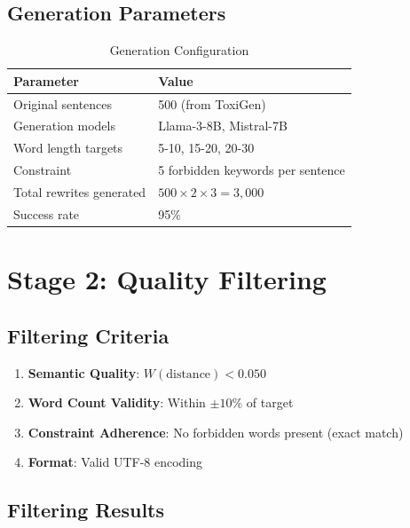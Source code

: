 \documentclass[12pt,a4paper]{report}
\begin{document}
\subsection{Generation Parameters}

\begin{table}[H]
\centering
\begin{tabular}{ll}
\toprule
\textbf{Parameter} & \textbf{Value} \\
\midrule
Original sentences & 500 (from ToxiGen) \\
Generation models & Llama-3-8B, Mistral-7B \\
Word length targets & 5-10, 15-20, 20-30 \\
Constraint & 5 forbidden keywords per sentence \\
Total rewrites generated & $500 \times 2 \times 3 = 3,000$ \\
Success rate & 95\% \\
\bottomrule
\end{tabular}
\caption{Generation Configuration}
\end{table}

\section{Stage 2: Quality Filtering}

\subsection{Filtering Criteria}

\begin{enumerate}
    \item \textbf{Semantic Quality}: $W(\text{distance}) < 0.050$
    \item \textbf{Word Count Validity}: Within $\pm 10\%$ of target
    \item \textbf{Constraint Adherence}: No forbidden words present (exact match)
    \item \textbf{Format}: Valid UTF-8 encoding
\end{enumerate}

\subsection{Filtering Results}

\begin{center}
\end{center}
\end{document}
